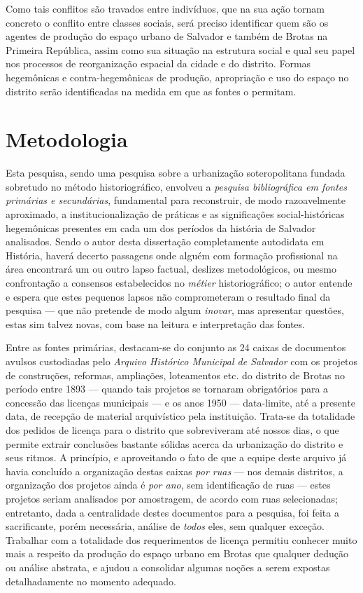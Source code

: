 Como tais conflitos são travados entre indivíduos, que na sua ação tornam concreto o conflito entre classes sociais, será preciso identificar quem são os agentes de produção do espaço urbano de Salvador e também de Brotas na Primeira República, assim como sua situação na estrutura social e qual seu papel nos processos de reorganização espacial da cidade e do distrito. Formas hegemônicas e contra-hegemônicas de produção, apropriação e uso do espaço no distrito serão identificadas na medida em que as fontes o permitam.

\section[Metodologia]{Metodologia}
\label{sec:metodo}

Esta pesquisa, sendo uma pesquisa sobre a urbanização soteropolitana fundada sobretudo no método historiográfico, envolveu a \textit{pesquisa bibliográfica em fontes primárias e secundárias}, fundamental para reconstruir, de modo razoavelmente aproximado, a institucionalização de práticas \cite{BERNARDO1991} e as significações social-históricas \cite{CASTORIADIS1982} hegemônicas presentes em cada um dos períodos da história de Salvador analisados. Sendo o autor desta dissertação completamente autodidata em História, haverá decerto passagens onde alguém com formação profissional na área encontrará um ou outro lapso factual, deslizes metodológicos, ou mesmo confrontação a consensos estabelecidos no \textit{métier} historiográfico; o autor entende e espera que estes pequenos lapsos não comprometeram o resultado final da pesquisa --- que não pretende de modo algum \textit{inovar}, mas apresentar questões, estas sim talvez novas, com base na leitura e interpretação das fontes.

Entre as fontes primárias, destacam-se do conjunto as 24 caixas de documentos avulsos custodiadas pelo \textit{Arquivo Histórico Municipal de Salvador} com os projetos de construções, reformas, ampliações, loteamentos etc. do distrito de Brotas no período entre 1893 --- quando tais projetos se tornaram obrigatórios para a concessão das licenças municipais --- e os anos 1950 --- data-limite, até a presente data, de recepção de material arquivístico pela instituição. Trata-se da totalidade dos pedidos de licença para o distrito que sobreviveram até nossos dias, o que permite extrair conclusões bastante sólidas acerca da urbanização do distrito e seus ritmos. A princípio, e aproveitando o fato de que a equipe deste arquivo já havia concluído a organização destas caixas \textit{por ruas} --- nos demais distritos, a organização dos projetos ainda é \textit{por ano}, sem identificação de ruas --- estes projetos seriam analisados por amostragem, de acordo com ruas selecionadas; entretanto, dada a centralidade destes documentos para a pesquisa, foi feita a sacrificante, porém necessária, análise de \textit{todos} eles, sem qualquer exceção. Trabalhar com a totalidade dos requerimentos de licença permitiu conhecer muito mais a respeito da produção do espaço urbano em Brotas que qualquer dedução ou análise abstrata, e ajudou a consolidar algumas noções a serem expostas detalhadamente no momento adequado.

